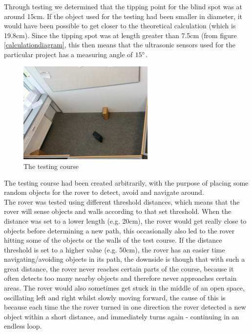 Through testing we determined that the tipping point for the blind spot was at around 15cm. If the object used for the testing had been smaller in diameter, it would have been possible to get closer to the theoretical calculation (which is 19.8cm). Since the tipping spot was at length greater than 7.5cm (from figure \ref{calculationdiagram}, this then means that the ultrasonic sensors used for the particular project has a measuring angle of $15\degree$. \\

\begin{figure}[H]
	\centering
	\includegraphics[width=0.6\textwidth]{images/testing-course.jpg}
	\caption{The testing course}
	\label{testcourse}
\end{figure}

The testing course had been created arbitrarily, with the purpose of placing some random objects for the rover to detect, avoid and navigate around.\\
The rover was tested using different threshold distances, which means that the rover will sense objects and walls according to that set threshold. When the distance was set to a lower length (e.g. 20cm), the rover would get really close to objects before determining a new path, this occasionally also led to the rover hitting some of the objects or the walls of the test course. If the distance threshold is set to a higher value (e.g. 50cm), the rover has an easier time navigating/avoiding objects in its path, the downside is though that with such a great distance, the rover never reaches certain parts of the course, because it often detects too many nearby objects and therefore never approaches certain areas. The rover would also sometimes get stuck in the middle of an open space, oscillating  left and right whilst slowly moving forward, the cause of this is because each time the the rover turned in one direction the rover detected a new object within a short distance, and immediately turns again - continuing in an endless loop.

